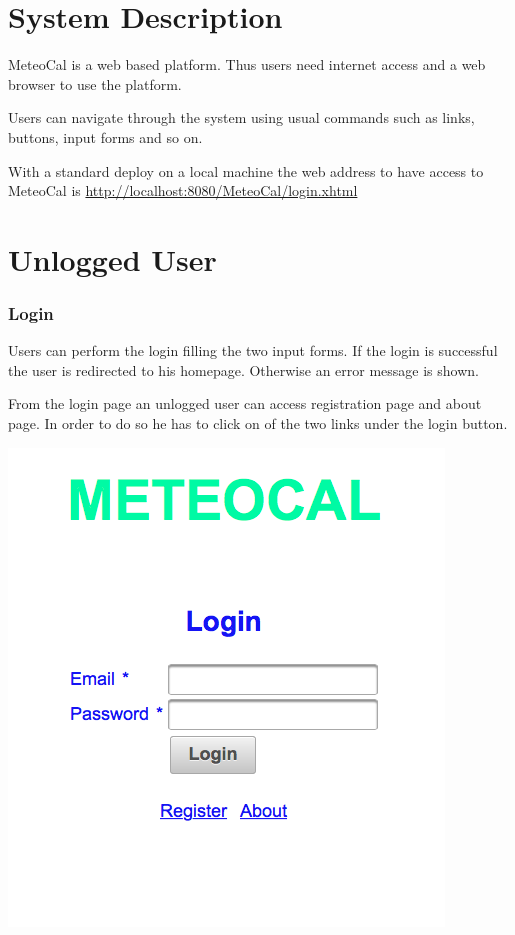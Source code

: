 \documentclass[10pt,a4paper,titlepage]{article}
\begin{document}

\tableofcontents

\pagebreak
\part{System Description}
MeteoCal is a web based platform. Thus users need internet access and a web browser to use the platform.

Users can navigate through the system using usual commands such as links, buttons, input forms and so on.

With a standard deploy on a local machine the web address to have access to MeteoCal is \url{http://localhost:8080/MeteoCal/login.xhtml}

\part{Unlogged User}

\section{Login}
Users can perform the login filling the two input forms. If the login is successful the user is redirected to his homepage. Otherwise an error message is shown.

From the login page an unlogged user can access registration page and about page. In order to do so he has to click on of the two links under the login button.

\begin{center}
\includegraphics[width=0.7\linewidth]{./images/01_login.png}
\end{center}
\end{document}
